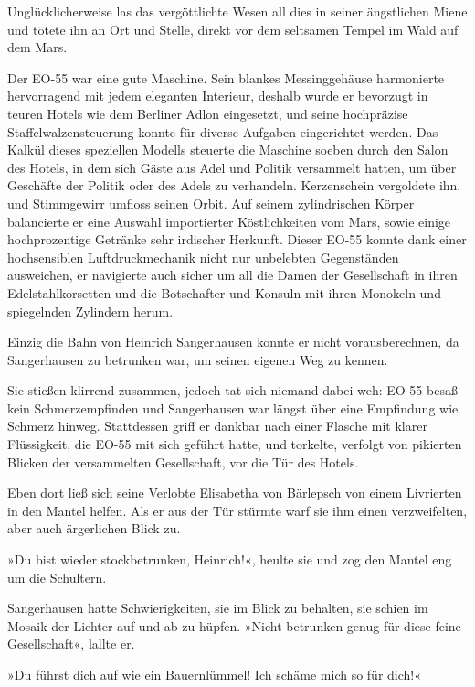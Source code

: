 Unglücklicherweise las das vergöttlichte Wesen all dies in seiner
ängstlichen Miene und tötete ihn an Ort und Stelle, direkt vor dem
seltsamen Tempel im Wald auf dem Mars.

\tb

Der EO-55 war eine gute Maschine. Sein blankes Messinggehäuse
harmonierte hervorragend mit jedem eleganten Interieur, deshalb
wurde er bevorzugt in teuren Hotels wie dem Berliner Adlon
eingesetzt, und seine hochpräzise Staffelwalzensteuerung konnte für
diverse Aufgaben eingerichtet werden. Das Kalkül dieses speziellen
Modells steuerte die Maschine soeben durch den Salon des Hotels, in
dem sich Gäste aus Adel und Politik versammelt hatten, um über
Geschäfte der Politik oder des Adels zu verhandeln. Kerzenschein
vergoldete ihn, und Stimmgewirr umfloss seinen Orbit. Auf seinem
zylindrischen Körper balancierte er eine Auswahl importierter
Köstlichkeiten vom Mars, sowie einige hochprozentige Getränke sehr
irdischer Herkunft. Dieser EO-55 konnte dank einer hochsensiblen
Luftdruckmechanik nicht nur unbelebten Gegenständen ausweichen, er
navigierte auch sicher um all die Damen der Gesellschaft in ihren
Edelstahlkorsetten und die Botschafter und Konsuln mit ihren
Monokeln und spiegelnden Zylindern herum.

Einzig die Bahn von Heinrich Sangerhausen konnte er nicht
vorausberechnen, da Sangerhausen zu betrunken war, um seinen
eigenen Weg zu kennen.

Sie stießen klirrend zusammen, jedoch tat sich niemand dabei weh:
EO-55 besaß kein Schmerzempfinden und Sangerhausen war längst über
eine Empfindung wie Schmerz hinweg. Stattdessen griff er dankbar
nach einer Flasche mit klarer Flüssigkeit, die EO-55 mit sich
geführt hatte, und torkelte, verfolgt von pikierten Blicken der
versammelten Gesellschaft, vor die Tür des Hotels.

Eben dort ließ sich seine Verlobte Elisabetha von Bärlepsch von
einem Livrierten in den Mantel helfen. Als er aus der Tür stürmte
warf sie ihm einen verzweifelten, aber auch ärgerlichen Blick zu.

»Du bist wieder stockbetrunken, Heinrich!«, heulte sie und zog den
Mantel eng um die Schultern.

Sangerhausen hatte Schwierigkeiten, sie im Blick zu behalten, sie
schien im Mosaik der Lichter auf und ab zu hüpfen. »Nicht betrunken
genug für diese feine Gesellschaft«, lallte er.

»Du führst dich auf wie ein Bauernlümmel! Ich schäme mich so für
dich!«

